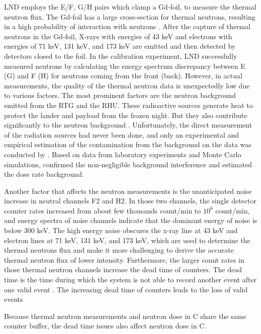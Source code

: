 \ac{LND} employs the E/F, G/H pairs which clamp a Gd-foil, to measure the thermal neutron flux. The Gd-foil has a large cross-section for thermal neutrons, resulting in a high probability of interaction with neutrons \citep{Wimmer2020SSRv}. After the capture of thermal neutrons in the Gd-foil, X-rays with energies of 43 keV and electrons with energies of 71 keV, 131 keV, and 173 keV are emitted and then detected by detectors closed to the foil.
In the calibration experiment, \ac{LND} successfully measured neutrons by calculating the energy spectrum discrepancy between E (G) and F (H) for neutrons coming from the front (back).
However, in actual measurements, the quality of the thermal neutron data is unexpectedly low due to various factors. The most prominent factors are the neutron background emitted from the \ac{RTG} and the \ac{RHU}. These radioactive sources generate heat to protect the lander and payload from the frozen night. But they also contribute significantly to the neutron background \citep{Zhang2020SciAdv}. Unfortunately, the direct measurement of the radiation sources had never been done, and only an experimental and empirical estimation of the contamination from the background on the data was conducted by \citet{Hou2020-LNDbackground}. Based on data from laboratory experiments and Monte Carlo simulations, \citet{Hou2020-LNDbackground} confirmed the non-negligible background interference and estimated the dose rate background. 

Another factor that affects the neutron measurements is the unanticipated noise increase in neutral channels F2 and H2. In those two channels, the single detector counter rates increased from about few thousands count/min to $10^6$ count/min, and energy spectra of noise channels indicate that the dominant energy of noise is below 300 keV. 
The high energy noise obscures the x-ray line at 43 keV and electron lines at 71 keV, 131 keV, and 173 keV, which are used to determine the thermal neutrons flux and make it more challenging to derive the accurate thermal neutron flux of lower intensity.
Furthermore, the larger count rates in those thermal neutron channels increase the dead time of counters. The dead time is the time during which the system is not able to record another event after one valid event \citep{leo1994techniques}. The increasing dead time of counters leads to the loss of valid events

Because thermal neutron measurements and neutron dose in C share the same counter buffer, the dead time issues also affect neutron dose in C. 

